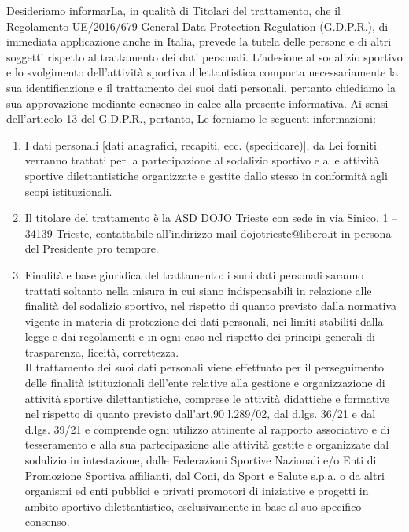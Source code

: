 \documentclass[
	headerstyle = TitleDojoFijlkam
]{djtsmod}
\begin{document}
	\newpage
	
	\fontsize{7pt}{10pt}\selectfont
	Desideriamo informarLa, in qualità di Titolari del trattamento, che il Regolamento UE/2016/679 General Data Protection Regulation (G.D.P.R.), di immediata applicazione anche in Italia, prevede la tutela delle persone e di altri soggetti rispetto al trattamento dei dati personali.
	L'adesione al sodalizio sportivo e lo svolgimento dell'attività sportiva dilettantistica comporta necessariamente la sua identificazione e il trattamento dei suoi dati personali, pertanto chiediamo la sua approvazione mediante consenso in calce alla presente informativa.
	Ai sensi dell'articolo 13 del G.D.P.R., pertanto, Le forniamo le seguenti informazioni:
	\begin{enumerate}[wide, labelindent = 0pt, noitemsep, topsep = 0pt]
		\item I dati personali [dati anagrafici, recapiti, ecc. (specificare)], da Lei forniti verranno trattati per la partecipazione al sodalizio sportivo e alle attività sportive dilettantistiche organizzate e gestite dallo stesso in conformità agli scopi istituzionali.
		\item Il titolare del trattamento è la ASD DOJO Trieste con sede in via Sinico, 1 – 34139 Trieste, contattabile all'indirizzo mail dojotrieste@libero.it  in persona del Presidente pro tempore.
		\item Finalità e base giuridica del trattamento: i suoi dati personali saranno trattati soltanto nella misura in cui siano indispensabili in relazione alle finalità del sodalizio sportivo, nel rispetto di quanto previsto dalla normativa vigente in materia di protezione dei dati personali, nei limiti stabiliti dalla legge e dai regolamenti e in ogni caso nel rispetto dei principi generali di trasparenza, liceità, correttezza. \\
		Il trattamento dei suoi dati personali viene effettuato  per il perseguimento delle finalità istituzionali dell'ente relative alla gestione e organizzazione di attività sportive dilettantistiche, comprese le attività didattiche e formative nel rispetto di quanto previsto dall'art.90 l.289/02, dal d.lgs. 36/21 e dal d.lgs. 39/21 e comprende ogni utilizzo attinente al rapporto associativo e di tesseramento e alla sua partecipazione alle attività gestite e organizzate dal sodalizio in intestazione, dalle Federazioni Sportive Nazionali e/o Enti di Promozione Sportiva affilianti,  dal Coni, da Sport e Salute s.p.a. o da altri organismi ed enti pubblici e privati promotori di iniziative e progetti in ambito sportivo dilettantistico, esclusivamente in base al suo specifico consenso. \\

\end{enumerate}
\end{document}
